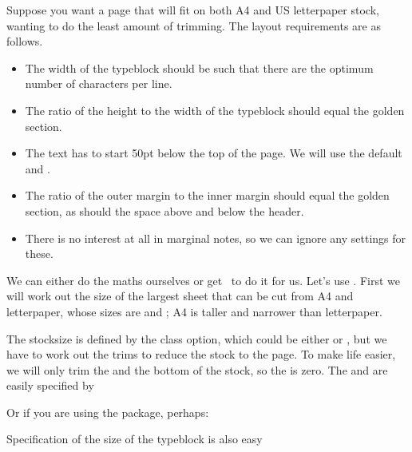     Suppose you want a page that will fit on both A4 
and US letterpaper stock,
wanting to do the least amount of trimming. The layout requirements
are as follows.
\begin{itemize}\tightlist
\item The width of the typeblock should be such that
  there are the optimum number of characters per line.
\item The ratio of the height to the width of the
  typeblock should equal the golden section.
\item The text has to start 50pt below the top of the page.  We will
  use the default \lnc{\headheight} and \lnc{\footskip}.
\item The ratio of the outer margin to the inner
  margin should equal the golden
  section, as should the space above and below
  the header.
\item There is no interest at all in
  marginal notes, so we can ignore any settings for
  these.
\end{itemize}
    We can either do the maths ourselves or get \ltx\ to do it for us. Let's
use \ltx. First we will work out the size of the largest sheet that can be
cut from A4 and 
letterpaper, 
whose sizes are  and 
; A4 is taller and narrower than letterpaper. 
\begin{lcode}
\settrimmedsize{11in}{210mm}{*}
\end{lcode}
The stocksize is defined by the class option, which could be either
 or , but we have to work out the
trims to reduce the stock to the page. To make life easier, 
we will only trim
the \foredge{} and the bottom of the stock, so the 
\lnc{\trimtop} is zero.
The \lnc{\trimtop} and \lnc{\trimedge} are easily specified by 
\begin{lcode}
\setlength{\trimtop}{0pt} 
\setlength{\trimedge}{\stockwidth}
\addtolength{\trimedge}{-\paperwidth}
\end{lcode}
Or if you are using the  package, perhaps:
\begin{lcode}
\settrims{0pt}{\stockwidth - \paperwidth}
\end{lcode}
Specification of the size of the typeblock is also easy 
\begin{lcode}
\end{lcode}
